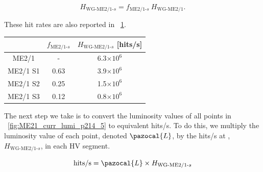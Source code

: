 \begin{equation}
	\label{eqn:ME21_HR_calc}
	H_{\text{WG-ME2/1-}s}=f_{\text{ME2/1-}s}  \  H_{\text{WG-ME2/1}}.
\end{equation}

These hit rates are also reported in \Tab~\ref{tab:21_hit_frac}. 

\begin{table}
	\centering
	\label{tab:21_hit_frac}
	\begin{tabular}{c|cc}
				& $f_{\text{ME2/1-}s}$    & $H_{\text{WG-ME2/1-}s}$ [hits/s]\\ \hline
	ME2/1       & -                       & 6.3$\times10^{6}$       \\ \hline
	ME2/1 S1    & 0.63                    & 3.9$\times10^{6}$       \\ \hline
	ME2/1 S2    & 0.25                    & 1.5$\times10^{6}$       \\ \hline
	ME2/1 S3    & 0.12                    & 0.8$\times10^{6}$       \\ 
	\end{tabular}
\end{table}

The next step we take is to convert the luminosity values of all points in \FigDot~\ref{fig:ME21_curr_lumi_p214_5} to equivalent \unit{hits/s}. To do this, we multiply the luminosity value of each point, denoted $\pazocal{L}$, by the \unit{hits/s} at , $H_{\text{WG-ME2/1-}s}$, in each HV segment.

\begin{equation}
	\label{eqn:lumi_to_hitrate}
	\text{hits/s} = \pazocal{L} \times H_{\text{WG-ME2/1-}s}
\end{equation}


